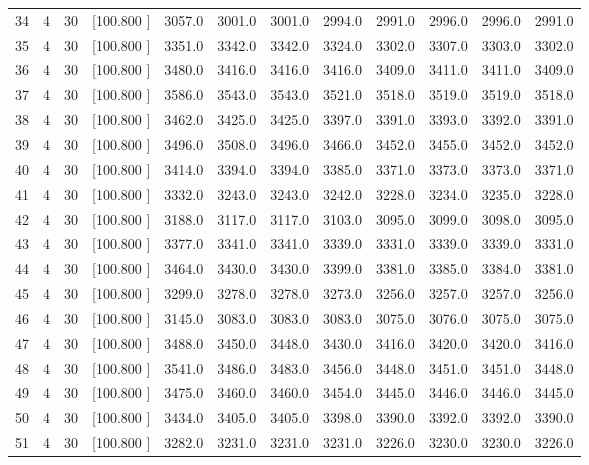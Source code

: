\documentclass[12pt,a4paper]{article}
\begin{document}
\begin{center}
{\begin{tabular}{r r r r r r r r r r r r}
  34&  4& 30&[100.800   ]&  3057.0&  3001.0&  3001.0&  2994.0&  2991.0&  2996.0&  2996.0&  2991.0\\[-0.02in]
  35&  4& 30&[100.800   ]&  3351.0&  3342.0&  3342.0&  3324.0&  3302.0&  3307.0&  3303.0&  3302.0\\[-0.02in]
  36&  4& 30&[100.800   ]&  3480.0&  3416.0&  3416.0&  3416.0&  3409.0&  3411.0&  3411.0&  3409.0\\[-0.02in]
  37&  4& 30&[100.800   ]&  3586.0&  3543.0&  3543.0&  3521.0&  3518.0&  3519.0&  3519.0&  3518.0\\[-0.02in]
  38&  4& 30&[100.800   ]&  3462.0&  3425.0&  3425.0&  3397.0&  3391.0&  3393.0&  3392.0&  3391.0\\[-0.02in]
  39&  4& 30&[100.800   ]&  3496.0&  3508.0&  3496.0&  3466.0&  3452.0&  3455.0&  3452.0&  3452.0\\[-0.02in]
  40&  4& 30&[100.800   ]&  3414.0&  3394.0&  3394.0&  3385.0&  3371.0&  3373.0&  3373.0&  3371.0\\[-0.02in]
  41&  4& 30&[100.800   ]&  3332.0&  3243.0&  3243.0&  3242.0&  3228.0&  3234.0&  3235.0&  3228.0\\[-0.02in]
  42&  4& 30&[100.800   ]&  3188.0&  3117.0&  3117.0&  3103.0&  3095.0&  3099.0&  3098.0&  3095.0\\[-0.02in]
  43&  4& 30&[100.800   ]&  3377.0&  3341.0&  3341.0&  3339.0&  3331.0&  3339.0&  3339.0&  3331.0\\[-0.02in]
  44&  4& 30&[100.800   ]&  3464.0&  3430.0&  3430.0&  3399.0&  3381.0&  3385.0&  3384.0&  3381.0\\[-0.02in]
  45&  4& 30&[100.800   ]&  3299.0&  3278.0&  3278.0&  3273.0&  3256.0&  3257.0&  3257.0&  3256.0\\[-0.02in]
  46&  4& 30&[100.800   ]&  3145.0&  3083.0&  3083.0&  3083.0&  3075.0&  3076.0&  3075.0&  3075.0\\[-0.02in]
  47&  4& 30&[100.800   ]&  3488.0&  3450.0&  3448.0&  3430.0&  3416.0&  3420.0&  3420.0&  3416.0\\[-0.02in]
  48&  4& 30&[100.800   ]&  3541.0&  3486.0&  3483.0&  3456.0&  3448.0&  3451.0&  3451.0&  3448.0\\[-0.02in]
  49&  4& 30&[100.800   ]&  3475.0&  3460.0&  3460.0&  3454.0&  3445.0&  3446.0&  3446.0&  3445.0\\[-0.02in]
  50&  4& 30&[100.800   ]&  3434.0&  3405.0&  3405.0&  3398.0&  3390.0&  3392.0&  3392.0&  3390.0\\[-0.02in]
  51&  4& 30&[100.800   ]&  3282.0&  3231.0&  3231.0&  3231.0&  3226.0&  3230.0&  3230.0&  3226.0\\[-0.02in]

\end{tabular}}
\end{center}
\end{document}
